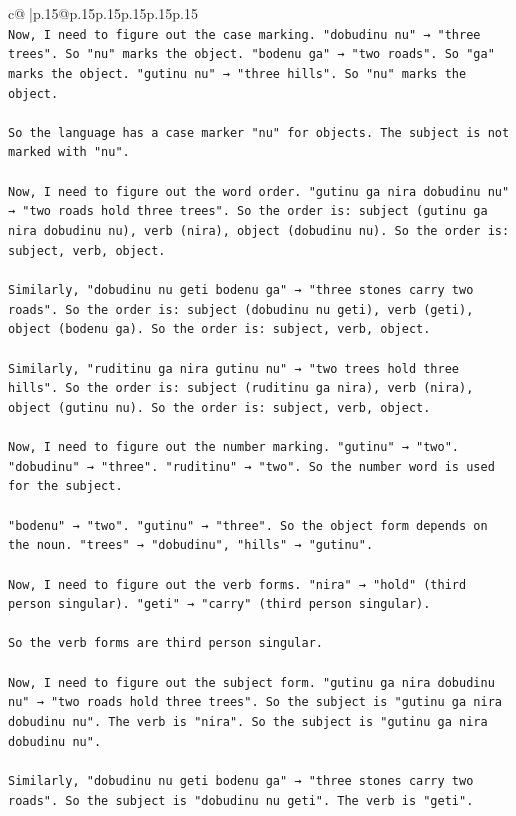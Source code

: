 \documentclass{article}
\begin{document}
{\begin{supertabular}{c@{$\;$}|p{.15\linewidth}@{}p{.15\linewidth}p{.15\linewidth}p{.15\linewidth}p{.15\linewidth}p{.15\linewidth}}
{{{\\ 
\texttt{Now, I need to figure out the case marking. "dobudinu nu" → "three trees". So "nu" marks the object. "bodenu ga" → "two roads". So "ga" marks the object. "gutinu nu" → "three hills". So "nu" marks the object.} \\
\\ 
\texttt{So the language has a case marker "nu" for objects. The subject is not marked with "nu".} \\
\\ 
\texttt{Now, I need to figure out the word order. "gutinu ga nira dobudinu nu" → "two roads hold three trees". So the order is: subject (gutinu ga nira dobudinu nu), verb (nira), object (dobudinu nu). So the order is: subject, verb, object.} \\
\\ 
\texttt{Similarly, "dobudinu nu geti bodenu ga" → "three stones carry two roads". So the order is: subject (dobudinu nu geti), verb (geti), object (bodenu ga). So the order is: subject, verb, object.} \\
\\ 
\texttt{Similarly, "ruditinu ga nira gutinu nu" → "two trees hold three hills". So the order is: subject (ruditinu ga nira), verb (nira), object (gutinu nu). So the order is: subject, verb, object.} \\
\\ 
\texttt{Now, I need to figure out the number marking. "gutinu" → "two". "dobudinu" → "three". "ruditinu" → "two". So the number word is used for the subject.} \\
\\ 
\texttt{"bodenu" → "two". "gutinu" → "three". So the object form depends on the noun. "trees" → "dobudinu", "hills" → "gutinu".} \\
\\ 
\texttt{Now, I need to figure out the verb forms. "nira" → "hold" (third person singular). "geti" → "carry" (third person singular).} \\
\\ 
\texttt{So the verb forms are third person singular.} \\
\\ 
\texttt{Now, I need to figure out the subject form. "gutinu ga nira dobudinu nu" → "two roads hold three trees". So the subject is "gutinu ga nira dobudinu nu". The verb is "nira". So the subject is "gutinu ga nira dobudinu nu".} \\
\\ 
\texttt{Similarly, "dobudinu nu geti bodenu ga" → "three stones carry two roads". So the subject is "dobudinu nu geti". The verb is "geti".} \\
}}}
\end{supertabular}}
\end{document}
